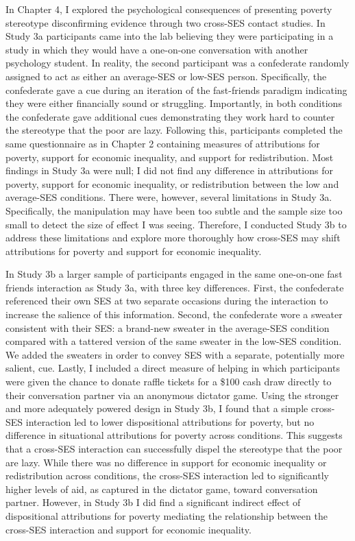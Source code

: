 \documentclass{sfuthesis}
\begin{document}
In Chapter 4, I explored the psychological consequences of presenting poverty stereotype disconfirming evidence through two cross-SES contact studies. In Study 3a participants came into the lab believing they were participating in a study in which they would have a one-on-one conversation with another psychology student. In reality, the second participant was a confederate randomly assigned to act as either an average-SES or low-SES person. Specifically, the confederate gave a cue during an iteration of the fast-friends paradigm indicating they were either financially sound or struggling. Importantly, in both conditions the confederate gave additional cues demonstrating they work hard to counter the stereotype that the poor are lazy. Following this, participants completed the same questionnaire as in Chapter 2 containing measures of attributions for poverty, support for economic inequality, and support for redistribution. Most findings in Study 3a were null; I did not find any difference in attributions for poverty, support for economic inequality, or redistribution between the low and average-SES conditions. There were, however, several limitations in Study 3a. Specifically, the manipulation may have been too subtle and the sample size too small to detect the size of effect I was seeing. Therefore, I conducted Study 3b to address these limitations and explore more thoroughly how cross-SES may shift attributions for poverty and support for economic inequality.

In Study 3b a larger sample of participants engaged in the same one-on-one fast friends interaction as Study 3a, with three key differences. First, the confederate referenced their own SES at two separate occasions during the interaction to increase the salience of this information. Second, the confederate wore a sweater consistent with their SES: a brand-new sweater in the average-SES condition compared with a tattered version of the same sweater in the low-SES condition. We added the sweaters in order to convey SES with a separate, potentially more salient, cue. Lastly, I included a direct measure of helping in which participants were given the chance to donate raffle tickets for a \$100 cash draw directly to their conversation partner via an anonymous dictator game. Using the stronger and more adequately powered design in Study 3b, I found that a simple cross-SES interaction led to lower dispositional attributions for poverty, but no difference in situational attributions for poverty across conditions. This suggests that a cross-SES interaction can successfully dispel the stereotype that the poor are lazy. While there was no difference in support for economic inequality or redistribution across conditions, the cross-SES interaction led to significantly higher levels of aid, as captured in the dictator game, toward conversation partner. However, in Study 3b I did find a significant indirect effect of dispositional attributions for poverty mediating the relationship between the cross-SES interaction and support for economic inequality.
\end{document}
